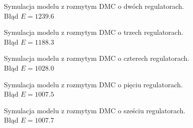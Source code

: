 \begin{figure}[ht]
\centering

\caption{Symulacja modelu z rozmytym DMC o dwóch regulatorach. \\
	Błąd $ E=\num{1239,6} $}
\label{Z6a}
\end{figure}

\begin{figure}[ht]
\centering

\caption{Symulacja modelu z rozmytym DMC o trzech regulatorach. \\
	Błąd $ E=\num{1188,3} $}
\label{Z6b}
\end{figure}

\begin{figure}[ht]
\centering

\caption{Symulacja modelu z rozmytym DMC o czterech regulatorach. \\
	Błąd $ E=\num{1028,0} $}
\label{Z6c}
\end{figure}

\begin{figure}[ht]
\centering

\caption{Symulacja modelu z rozmytym DMC o pięciu regulatorach. \\
	Błąd $ E=\num{1007.5} $}
\label{Z6d}
\end{figure}

\begin{figure}[ht]
\centering

\caption{Symulacja modelu z rozmytym DMC o sześciu regulatorach. \\
	Błąd $ E=\num{1007.7} $}
\label{Z6e}
\end{figure}
